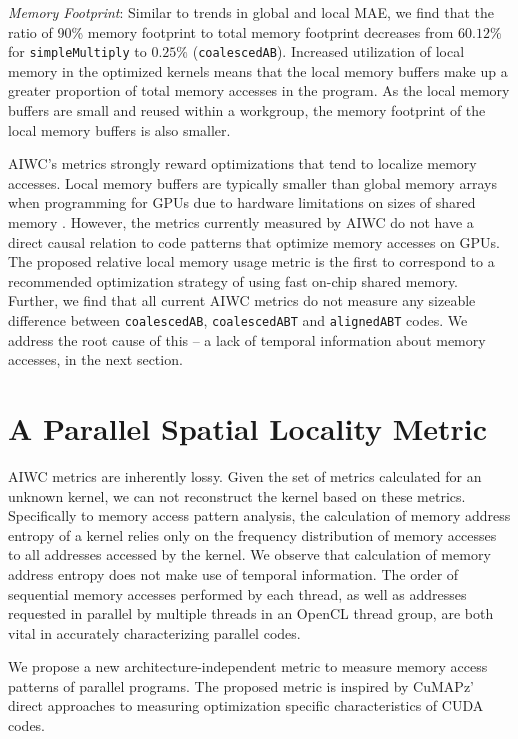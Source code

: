 \documentclass[review=false, sigchi]{acmart}
\begin{document}
	\textit{Memory Footprint}: Similar to trends in global and local MAE, we find that the ratio of 90\% memory footprint to total memory footprint decreases from $60.12\%$ for \texttt{simpleMultiply} to $0.25\%$ (\texttt{coalescedAB}). Increased utilization of local memory in the optimized kernels means that the local memory buffers make up a greater proportion of total memory accesses in the program. As the local memory buffers are small and reused within a workgroup, the memory footprint of the local memory buffers is also smaller. 
	
	AIWC's metrics strongly reward optimizations that tend to localize memory accesses. Local memory buffers are typically smaller than global memory arrays when programming for GPUs due to hardware limitations on sizes of shared memory \cite{cudamanual}. However, the metrics currently measured by AIWC do not have a direct causal relation to code patterns that optimize memory accesses on GPUs. The proposed relative local memory usage metric is the first to correspond to a recommended optimization strategy of using fast on-chip shared memory. Further, we find that all current AIWC metrics do not measure any sizeable difference between \texttt{coalescedAB}, \texttt{coalescedABT} and \texttt{alignedABT} codes. We address the root cause of this -- a lack of temporal information about memory accesses, in the next section.%
	
	\section{A Parallel Spatial Locality Metric} \label{discussion}
	
	AIWC metrics are inherently lossy. Given the set of metrics calculated for an unknown kernel, we can not reconstruct the kernel based on these metrics. Specifically to memory access pattern analysis, the calculation of memory address entropy of a kernel relies only on the frequency distribution of memory accesses to all addresses accessed by the kernel. We observe that calculation of memory address entropy does not make use of temporal information. The order of sequential memory accesses performed by each thread, as well as addresses requested in parallel by multiple threads in an OpenCL thread group, are both vital in accurately characterizing parallel codes.
	
	We propose a new architecture-independent metric to measure memory access patterns of parallel programs.
	The proposed metric is inspired by CuMAPz' direct approaches to measuring optimization specific characteristics of CUDA codes.
	
\end{document}
